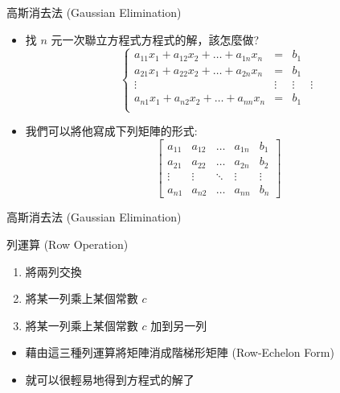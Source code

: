 \documentclass[aspectratio=169]{beamer}
\begin{document}
\begin{frame}{高斯消去法 (Gaussian Elimination)}
    \begin{itemize}
        \item<1-> 找 $n$ 元一次聯立方程式方程式的解，該怎麼做?
        \begin{equation*}
            \left\{
                \begin{matrix}
                    a_{11}x_1 + a_{12}x_2 + \dots + a_{1n}x_n &=& b_1\\
                    a_{21}x_1 + a_{22}x_2 + \dots + a_{2n}x_n &=& b_1\\
                    \vdots & \vdots & \vdots & \vdots \\
                    a_{n1}x_1 + a_{n2}x_2 + \dots + a_{nn}x_n &=& b_1\\
                \end{matrix}
            \right.
        \end{equation*}
        \item<2-> 我們可以將他寫成下列矩陣的形式:
        \begin{equation*}
            \displaystyle \left[{
                \begin{array}{cccc|c}
                    a_{11} & a_{12} & \dots & a_{1n} & b_1 \\
                    a_{21} & a_{22} & \dots & a_{2n} & b_2 \\
                    \vdots & \vdots & \ddots & \vdots & \vdots \\
                    a_{n1} & a_{n2} & \dots & a_{nn} & b_n 
                \end{array}}\right]
        \end{equation*}
    \end{itemize}
\end{frame}

\begin{frame}{高斯消去法 (Gaussian Elimination)}
    \begin{alertblock}{列運算 (Row Operation)}
        \begin{enumerate}
            \item 將兩列交換
            \item 將某一列乘上某個常數 $c$
            \item 將某一列乘上某個常數 $c$ 加到另一列
        \end{enumerate}
    \end{alertblock}
    \begin{itemize}
        \item 藉由這三種列運算將矩陣消成階梯形矩陣 (Row-Echelon Form)
        \item 就可以很輕易地得到方程式的解了
    \end{itemize}
\end{frame}
\end{document}
